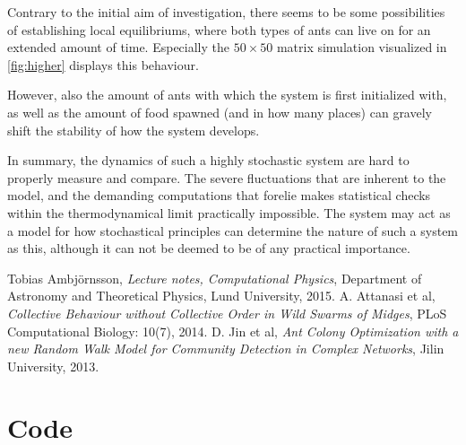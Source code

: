 \documentclass[a4paper,12pt]{article}
\theoremstyle{plain}
\theoremstyle{definition}
\begin{document}
      Contrary to the initial aim of investigation, there seems to be some
      possibilities of establishing local equilibriums, where both types of ants
      can live on for an extended amount of time. Especially the $50 \times 50$ matrix
      simulation visualized in \cref{fig:higher} displays this behaviour.

      However, also the amount of ants with which the system is first initialized
      with, as well as the amount of food spawned (and in how many places)
      can gravely shift the stability of how the system develops. 

      In summary, the dynamics of such a highly stochastic system are hard to
      properly measure and compare. The severe fluctuations that are inherent to
      the model, and the demanding computations that forelie makes statistical
      checks within the thermodynamical limit practically impossible. The
      system may act as a model for how stochastical principles can determine
      the nature of such a system as this, although it can not be deemed to be
      of any practical importance. 

\newpage

\begin{thebibliography}{99}
     Tobias Ambjörnsson,
     \emph{Lecture notes, Computational Physics},
     Department of Astronomy and Theoretical Physics,
     Lund University,
     2015.
      A. Attanasi et al,
      \emph{Collective Behaviour without Collective Order in Wild Swarms of
      Midges},
      PLoS Computational Biology: 10(7),
      2014.
      D. Jin et al,
      \emph{Ant Colony Optimization with a new Random Walk Model for Community
      Detection in Complex Networks},
      Jilin University,
      2013.
\end{thebibliography}
\newpage
\appendix
\section{Code}
   \label{sec:code}
   
   
   
   
   
   
   
   
   
\end{document}
